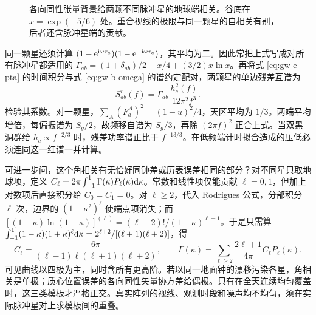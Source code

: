 \begin{figure}[htbp]
 \centering
 \caption{各向同性张量背景给两颗不同脉冲星的地球端相关。谷底在 $x=\exp(-5/6)$ 处。重合视线的极限与同一颗星的自相关有别，后者还含脉冲星端的贡献。}
 \label{fig:gw-e-hd}
\end{figure}

同一颗星还须计算 $(1-\mathrm{e}^{\mathrm{i}\omega\tau_a})(1-\mathrm{e}^{-\mathrm{i}\omega\tau_a})$，其平均为二。因此常把上式写成对所有脉冲星都适用的 $\Gamma_{ab}=(1+\delta_{ab})/2-x/4+(3/2)x\ln x$。再将式 \eqref{eq:gw-e-pta} 的时间积分与式 \eqref{eq:gw-b-omega} 的谱约定配对，两颗星的单边残差互谱为
\begin{equation}\label{eq:gw-e-res}
 S_{ab}^r(f)=\Gamma_{ab}\,\frac{h_c^2(f)}{12\pi^2 f^3}.
\end{equation}
检验其系数。对一颗星，$\sum_A(F_a^A)^2=(1-u)^2/4$，天区平均为 $1/3$。两端平均增倍，每偏振谱为 $S_g/2$，故频移自谱为 $S_g/3$，再除 $(2\pi f)^2$ 正合上式。当双黑洞群给 $h_c\propto f^{-2/3}$ 时，残差功率谱正比于 $f^{-13/3}$。在低频端计时拟合造成的压低必须连同这一红谱一并计算。

可进一步问，这个角相关有无恰好同钟差或历表误差相同的部分？对不同星只取地球项，定义 $C_\ell=2\pi\int_{-1}^1\Gamma(\kappa)P_\ell(\kappa)\dd\kappa$。常数和线性项仅能贡献 $\ell=0,1$，但加上对数项后直接积分给 $C_0=C_1=0$。对 $\ell\ge2$，代入 Rodrigues 公式，分部积分 $\ell$ 次，边界的 $(1-\kappa^2)^\ell$ 使端点项消失；而 $[(1-\kappa)\ln(1-\kappa)]^{(\ell)}=(\ell-2)!/(1-\kappa)^{\ell-1}$。于是只需算 $\int_{-1}^1(1-\kappa)(1+\kappa)^\ell\dd\kappa=2^{\ell+2}/[(\ell+1)(\ell+2)]$，得
\[
 C_\ell=\frac{6\pi}{(\ell-1)\ell(\ell+1)(\ell+2)},\qquad
 \Gamma(\kappa)=\sum_{\ell\ge2}\frac{2\ell+1}{4\pi}C_\ell P_\ell(\kappa).
\]
可见曲线以四极为主，同时含所有更高阶。若以同一地面钟的漂移污染各星，角相关是单极；质心位置误差的各向同性矢量协方差给偶极。只有在全天连续均匀覆盖时，这三类模板才严格正交。真实阵列的视线、观测时段和噪声均不均匀，须在实际脉冲星对上求模板间的重叠。

